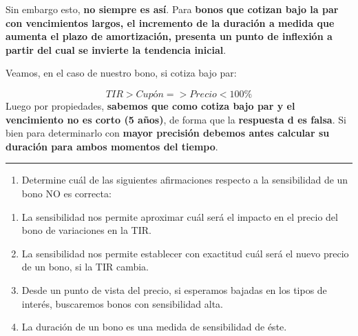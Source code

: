 \documentclass[
  letterpaper,
  DIV=11,
  numbers=noendperiod]{scrreprt}
\providecommand{\tightlist}{%
  \setlength{\itemsep}{0pt}\setlength{\parskip}{0pt}}\usepackage{longtable,booktabs,array}
\begin{document}
\begin{tcolorbox}
\begin{tcolorbox}[enhanced jigsaw, toprule=.15mm, left=2mm, arc=.35mm, breakable, bottomrule=.15mm, opacityback=0, rightrule=.15mm, leftrule=.75mm, colframe=quarto-callout-note-color-frame, colback=white]
\begin{minipage}[t]{\textwidth - 5.5mm}
Sin embargo esto, \textbf{no siempre es así}. Para \textbf{bonos que
cotizan bajo la par con vencimientos largos, el incremento de la
duración a medida que aumenta el plazo de amortización, presenta un
punto de inflexión a partir del cual se invierte la tendencia inicial}.

Veamos, en el caso de nuestro bono, si cotiza bajo par:

\[TIR > Cupón => Precio < 100\%\] Luego por propiedades, \textbf{sabemos
que como cotiza bajo par y el vencimiento no es corto (5 años)}, de
forma que la \textbf{respuesta d es falsa}. Si bien para determinarlo
con \textbf{mayor precisión debemos antes calcular su duración para
ambos momentos del tiempo}.

\end{minipage}%
\end{tcolorbox}

\begin{center}\rule{0.5\linewidth}{0.5pt}\end{center}

\begin{enumerate}
\def\labelenumi{\arabic{enumi}.}
\setcounter{enumi}{5}
\tightlist
\item
  Determine cuál de las siguientes afirmaciones respecto a la
  sensibilidad de un bono NO es correcta:
\end{enumerate}

\begin{enumerate}
\def\labelenumi{\alph{enumi}.}
\item
  La sensibilidad nos permite aproximar cuál será el impacto en el
  precio del bono de variaciones en la TIR.
\item
  La sensibilidad nos permite establecer con exactitud cuál será el
  nuevo precio de un bono, si la TIR cambia.
\item
  Desde un punto de vista del precio, si esperamos bajadas en los tipos
  de interés, buscaremos bonos con sensibilidad alta.
\item
  La duración de un bono es una medida de sensibilidad de éste.
\end{enumerate}

\begin{tcolorbox}[enhanced jigsaw, toprule=.15mm, left=2mm, arc=.35mm, breakable, bottomrule=.15mm, opacityback=0, rightrule=.15mm, leftrule=.75mm, colframe=quarto-callout-note-color-frame, colback=white]
\begin{minipage}[t]{5.5mm}
\textcolor{quarto-callout-note-color}{\faInfo}
\end{minipage}%
\begin{minipage}[t]{\textwidth - 5.5mm}


\end{minipage}
\end{tcolorbox}
\end{tcolorbox}
\end{document}

